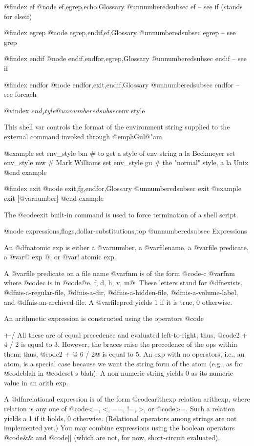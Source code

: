 {@findex ef
@node ef,egrep,echo,Glossary
@unnumberedsubsec ef
-- see if               (stands for elseif)

@findex egrep
@node egrep,endif,ef,Glossary
@unnumberedsubsec egrep
-- see grep

@findex endif
@node endif,endfor,egrep,Glossary
@unnumberedsubsec endif
-- see if

@findex endfor
@node endfor,exit,endif,Glossary
@unnumberedsubsec endfor
-- see foreach

@vindex $end_style
@unnumberedsubsec $env style 

This shell var controls the format of the environment string supplied to
the external command invoked through @emph{Gul@"am}.

@example
set env_style bm # to get a style of env string a la Beckmeyer
set env_style mw # Mark Williams
set env_style gu # the "normal" style, a la Unix
@end example

@findex exit
@node exit,fg,endfor,Glossary
@unnumberedsubsec exit
@example
exit [@var{number}]
@end example

The @code{exit} built-in command is used to force termination of a shell
script.

@node expressions,flags,dollar-substitutions,top
@unnumberedsubsec Expressions 

An @dfn{atomic exp} is either a @var{number}, a @var{filename}, a @var{file
predicate}, a @var{@{ exp @}}, or @var{! atomic exp}.

A @var{file predicate} on a file name @var{fnm} is of the form @code{-c
@var{fnm}} where @code{c} is in @code{@{e, f, d, h, v, m@}}.  These letters
stand for @dfn{exists}, @dfn{is-a-regular-file}, @dfn{is-a-dir},
@dfn{is-a-hidden-file}, @dfn{is-a-volume-label}, and
@dfn{is-an-archived-file}.  A @var{filepred} yields 1 if it is true, 0
otherwise.

An arithmetic expression is constructed using the operators @code{+-/%
All these are of equal precedence and evaluated left-to-right; thus,
@code{2 + 4 / 2} is equal to 3.  However, the braces raise the precedence
of the ops within them; thus, @code{2 + @{ 6 / 2@}} is equal to 5.  An exp
with no operators, i.e., an atom, is a special case because we want the
string form of the atom (e.g., as for @code{blah} in @code{set s blah}).  A
non-numeric string yields 0 as its numeric value in an arith exp.

A @dfn{relational expression} is of the form @code{arithexp relation
arithexp}, where relation is any one of @code{<=, <, ==, !=, >,} or
@code{>=}.  Such a relation yields a 1 if it holds, 0 otherwise.
(Relational operators among strings are not implemented yet.)  You may
combine expressions using the boolean operators @code{&&} and @code{||}
(which are not, for now, short-circuit evaluated).

}}
